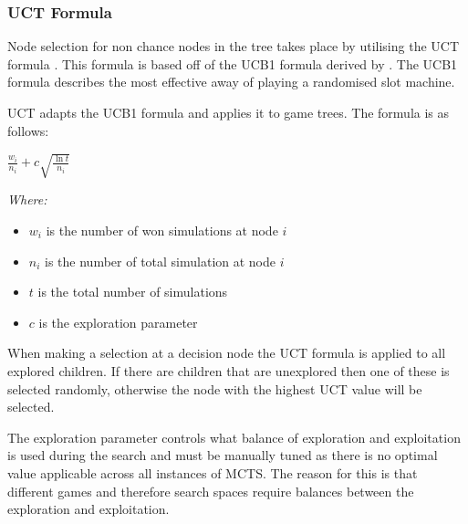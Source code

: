 \documentclass[]{article}
\begin{document}
\subsubsection{UCT Formula}
Node selection for non chance nodes in the tree takes place by utilising the UCT formula \autocite{kocsis2006bandit}. This formula is based off of the UCB1 formula derived by \textcite{auer2002finite}. The UCB1 formula describes the most effective away of playing a randomised slot machine. 

\par UCT adapts the UCB1 formula and applies it to game trees. The formula is as follows: 

\vspace{0.2cm}
\begin{center}
	\large
	$\frac{w_i}{n_i} + c\sqrt{\frac{\ln t}{n_i} }$
\end{center}

\textit{Where: }
\begin{itemize}
\item $w_i$ is the number of won simulations at node $i$
\item $n_i$ is the number of total simulation at node $i$
\item $t$ is the total number of simulations
\item $c$ is the exploration parameter
\end{itemize}

\par When making a selection at a decision node the UCT formula is applied to all explored children. If there are children that are unexplored then one of these is selected randomly, otherwise the node with the highest UCT value will be selected.

\par The exploration parameter controls what balance of exploration and exploitation is used during the search and must be manually tuned as there is no optimal value applicable across all instances of MCTS. The reason for this is that different games and therefore search spaces require balances between the exploration and exploitation.  
\end{document}
